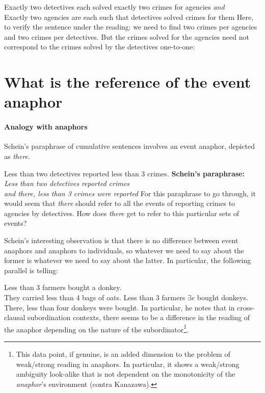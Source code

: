 \documentclass[english]{article}
\newcommand{\fg}{\color{darkred}}
\begin{document}
\ex
Exactly two detectives each solved exactly two crimes for agencies \emph{and}\\
Exactly two agencies are each such that detectives solved crimes for them
\xe
%
Here, to verify the sentence under the reading: we need to find two crimes per agencies and two crimes per detectives. But the crimes solved for the agencies need not correspond to the crimes solved by the detectives one-to-one:

\ex

\xe
%


\section{What is the reference of the event anaphor}

\paragraph{Analogy with anaphors}
Schein's paraphrase of cumulative sentences involves an event anaphor, depicted as \emph{there}. 

\pex
\a 
Less than two detectives reported less than 3 crimes. 
\a \textbf{Schein's paraphrase:}\\
\emph{
Less than two detectives reported crimes\\
and there, less than 3 crimes were reported
}
\xe
%
For this paraphrase to go through, it would seem that \emph{there} should refer to all the events of reporting crimes to agencies by detectives. How does \emph{there} get to refer to this particular sets of events?

Schein's interesting observation is that there is no difference between event anaphors and anaphors to individuals, so whatever we need to say about the former is whatever we need to say about the latter. In particular, the following parallel is telling:

\pex
\a 
{\color{darkorange!84!black} Less than 3 farmers} bought {\fg a donkey}.\\
{\color{purple!93!black} They} carried {\color{bluegray!93!black} less than 4 bags of oats}.
\a 
{\color{darkorange!84!black} Less than 3 farmers} {\fg $\exists e$} bought donkeys.\\
{\color{purple!93!black} There,} {\color{bluegray!93!black} less than four donkeys} were bought.
\xe
%
In particular, he notes that in cross-clausal subordination contexts, there seems to be a difference in the reading of the anaphor depending on the nature of the subordinator\footnote{This data point, if genuine, is an added dimension to the problem of weak/strong reading in anaphors. In particular, it shows a weak/strong ambiguity look-alike that is not dependent on the monotonicity of the \emph{anaphor}'s environment (contra Kanazawa).}.
\end{document}
